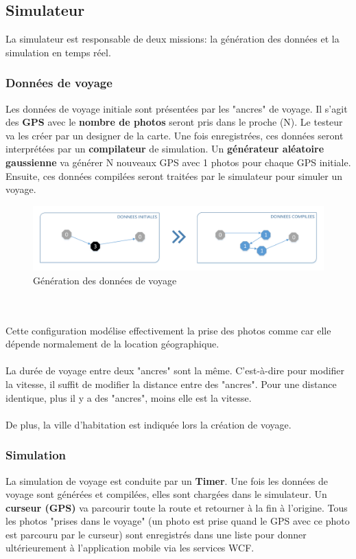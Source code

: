 \documentclass{article}
\begin{document}
\vspace{0.2 cm}
\subsection{\Large Simulateur}
La simulateur est responsable de deux missions: la génération des données et la simulation en temps réel. 

\vspace{0.2 cm}
\subsubsection{\large Données de voyage}
Les données de voyage initiale sont présentées par les "ancres" de voyage. Il s'agit des \textbf{GPS} avec le \textbf{nombre de photos} seront pris dans le proche (N). Le testeur va les créer par un designer de la carte. Une fois enregistrées, ces données seront interprétées par un \textbf{compilateur} de simulation. Un \textbf{générateur aléatoire gaussienne} va générer N nouveaux GPS avec 1 photos pour chaque GPS initiale. Ensuite, ces données compilées seront traitées par le simulateur pour simuler un voyage. 
\\
\begin{figure}[h!]
\centering
\includegraphics[width=150mm]{TRAVELDATA.pdf}
\caption{Génération des données de voyage}
\end{figure}
\\\\ Cette configuration modélise effectivement la prise des photos comme car elle dépende normalement de la location géographique.
\\\\ La durée de voyage entre deux "ancres" sont la même. C'est-à-dire pour modifier la vitesse, il suffit de modifier la distance entre des "ancres". Pour une distance identique, plus il y a des "ancres", moins elle est la vitesse.
\\\\ De plus, la ville d'habitation est indiquée lors la création de voyage.
\vspace{0.2 cm}
\subsubsection{\large Simulation}
La simulation de voyage est conduite par un \textbf{Timer}. Une fois les données de voyage sont générées et compilées, elles sont chargées dans le simulateur. Un \textbf{curseur (GPS)} va parcourir toute la route et retourner à la fin à l'origine. Tous les photos "prises dans le voyage"  (un photo est prise quand le GPS avec ce photo est parcouru par le curseur) sont enregistrés dans une liste pour donner ultérieurement à l'application mobile via les services WCF.
\end{document}
